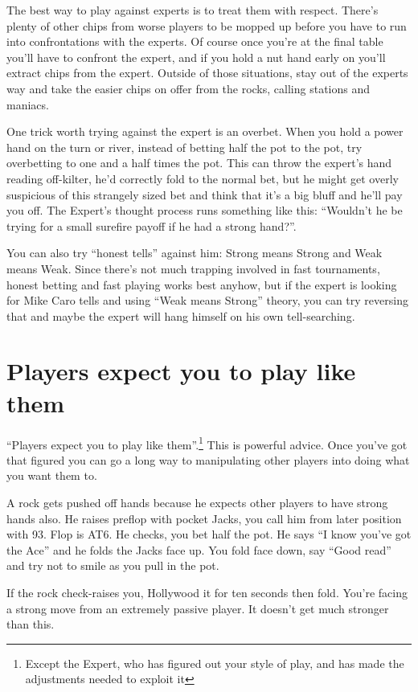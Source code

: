 The best way to play against experts
is to treat them with respect. There's plenty of other chips
from worse players to be mopped up before you have to run into
confrontations with the experts. Of course once you're at the final
table you'll have to confront the expert, and if you hold a nut hand
early on you'll extract chips from the expert. Outside of those
situations, stay out of the experts way and take the easier chips
on offer from the rocks, calling stations and maniacs.

One trick worth trying against the expert is an overbet. When you
hold a power hand on the turn or river, instead of betting half the pot
to the pot, try overbetting to one and a half times the pot. This can
throw the expert's hand reading off-kilter, he'd correctly fold to
the normal bet, but he might get overly suspicious of this strangely
sized bet and think that it's a big bluff and he'll pay you off.
The Expert's thought process runs something like this: ``Wouldn't he
be trying for a small surefire payoff if he had a strong hand?''.

You can also try ``honest tells'' against him: Strong means Strong and
Weak means Weak. Since there's not much trapping involved in fast 
tournaments, honest betting and fast playing works best anyhow, but
if the expert is looking for Mike Caro tells and using 
``Weak means Strong'' theory, you can try reversing that and maybe
the expert will hang himself on his own tell-searching.

\section{Players expect you to play like them}

``Players expect you to play like them''.\footnote{Except the Expert, who
has figured out your style of play, and has made the adjustments
needed to exploit it} This is powerful advice.
Once you've got that figured you
can go a long way to manipulating other players into doing what
you want them to.

A rock gets pushed off hands because he expects other players to
have strong hands also. He raises preflop with pocket Jacks,
you call him from later position with 93. Flop is AT6. He checks, you
bet half the pot. He says ``I know you've got the Ace'' and he
folds the Jacks face up. You fold face down, say ``Good read''
and try not to smile as you pull in the pot.

If the rock check-raises you, Hollywood it for ten seconds then fold.
You're facing a strong move from an extremely passive player. It
doesn't get much stronger than this.

